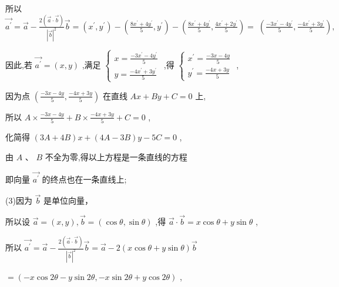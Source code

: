 \documentclass[10pt]{article}
\begin{document}
所以 \(\overrightarrow{{a}^{\prime }} = \overrightarrow{a} - \frac{2\left( {\overrightarrow{a} \cdot  \overrightarrow{b}}\right) }{{\left| \overrightarrow{b}\right| }^{2}}\overrightarrow{b} = \left( {{x}^{\prime },{y}^{\prime }}\right)  - \left( {\frac{8{x}^{\prime } + 4{y}^{\prime }}{5},{y}^{\prime }}\right)  - \left( {\frac{8{x}^{\prime } + 4{y}^{\prime }}{5},\frac{4{x}^{\prime } + 2{y}^{\prime }}{5}}\right)  = \; \left( {\frac{-3{x}^{\prime } - 4{y}^{\prime }}{5},\frac{-4{x}^{\prime } + 3{y}^{\prime }}{5}}\right) ,\)

因此,若 \(\overrightarrow{{a}^{\prime }} = \left( {x,y}\right)\) ,满足 \(\left\{  \begin{array}{l} x = \frac{-3{x}^{\prime } - 4{y}^{\prime }}{5} \\  y = \frac{-4{x}^{\prime } + 3{y}^{\prime }}{5} \end{array}\right.\) ,得 \(\left\{  \begin{array}{l} {x}^{\prime } = \frac{-{3x} - {4y}}{5} \\  {y}^{\prime } = \frac{-{4x} + {3y}}{5} \end{array}\right.\) ,

因为点 \(\left( {\frac{-{3x} - {4y}}{5},\frac{-{4x} + {3y}}{5}}\right)\) 在直线 \({Ax} + {By} + C = 0\) 上,

所以 \(A \times  \frac{-{3x} - {4y}}{5} + B \times  \frac{-{4x} + {3y}}{5} + C = 0\) ,

化简得 \(\left( {{3A} + {4B}}\right) x + \left( {{4A} - {3B}}\right) y - {5C} = 0\) ,

由 \(A\text{ 、 }B\) 不全为零,得以上方程是一条直线的方程

即向量 \(\overrightarrow{{a}^{\prime }}\) 的终点也在一条直线上;

(3)因为 \(\overrightarrow{b}\) 是单位向量，

所以设 \(\overrightarrow{a} = \left( {x,y}\right) ,\overrightarrow{b} = \left( {\cos \theta ,\sin \theta }\right)\) ,得 \(\overrightarrow{a} \cdot  \overrightarrow{b} = x\cos \theta  + y\sin \theta\) ,

所以 \(\overrightarrow{{a}^{\prime }} = \overrightarrow{a} - \frac{2\left( {\overrightarrow{a} \cdot  \overrightarrow{b}}\right) }{{\left| \overrightarrow{b}\right| }^{2}}\overrightarrow{b} = \overrightarrow{a} - 2\left( {x\cos \theta  + y\sin \theta }\right) \overrightarrow{b}\)

\(= \left( {-x\cos {2\theta } - y\sin {2\theta }, - x\sin {2\theta } + y\cos {2\theta }}\right)\) ,
\end{document}
